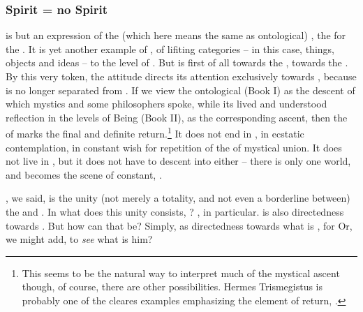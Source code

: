 %
\subsubsection{Spirit = no Spirit}

\pa
{} is but an expression of the  (which here
means the same as ontological) ,
the  for the . It is yet another example of
, of lifiting  categories -- in this case,
things, objects and ideas -- to the level of . 
%
But  is first of all 
towards the , towards the . 
By this very token, the
 attitude directs its attention exclusively
towards , because  is no longer 
separated from .  
If we view the ontological  (Book I) as the descent of
which mystics and some philosophers spoke, while its lived and understood
reflection in the
levels of Being (Book II), as the corresponding ascent, then the 
 of  marks the final and definite 
return.\footnote{This seems to be the natural way to interpret much 
of the mystical ascent though, of course, there are other possibilities. 
Hermes Trismegistus is probably one of the cleares examples 
emphasizing the element of return, .} 
%
It does not end in , in ecstatic
contemplation, in constant wish for repetition of the 
of mystical union. It does not live in , but it 
does not have to descent into  either -- there is only 
one world, and  becomes the scene of constant, 
.

\pa
{}, we said, is the unity (not merely a totality, and not even
a borderline between) the  and . In what
does this unity consists, ? , in
 particular.  is also 
directedness towards . But how can
that be? Simply, as directedness towards what is , for
Or, we might add, to {\em see} what is  him?

